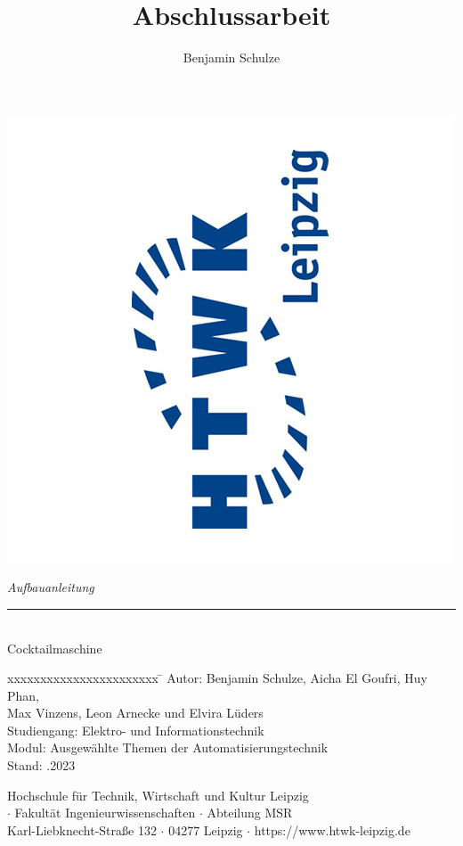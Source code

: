 \documentclass[10pt,a4paper]{report}
\title{Abschlussarbeit}
\author{Benjamin Schulze}
\begin{document}
	\begin{titlepage}
		\begin{flushleft}
			\includegraphics[scale=0.3]{HTWK_Logo.jpg}
		\end{flushleft}
		
		\begin{flushright}
			\vspace{2cm}
			\LARGE \textsl{Aufbauanleitung} \\
			\rule{0.6\textwidth}{0.4pt} ~\\
			\vspace{0.5cm}
			\textsf{\LARGE Cocktailmaschine}
		\end{flushright}
		
		\vspace{3cm}
		\large
		\begin{tabbing}
			xxxxxxxxxxxxxxxxxxxxxxx \= \kill
			Autor: \> Benjamin Schulze, Aicha El Goufri, Huy Phan, \\\>Max Vinzens, Leon Arnecke und Elvira Lüders \\ [0.5cm]
			Studiengang:  \> Elektro- und Informationstechnik \\ [0.5cm]
			Modul:  \> Ausgewählte Themen der Automatisierungstechnik \\ [0.5cm]
			Stand: .2023 \\
		\end{tabbing}
		
		\vspace{4cm}
		\small
		\begin{center}
			Hochschule für Technik, Wirtschaft und Kultur Leipzig \\$\cdot$
			Fakultät Ingenieurwissenschaften $\cdot$
			Abteilung MSR \\
			Karl-Liebknecht-Straße 132 $\cdot$
			04277 Leipzig $\cdot$
			https://www.htwk-leipzig.de
		\end{center}
	\end{titlepage}
	\newpage
	\tableofcontents
	
\end{document}
